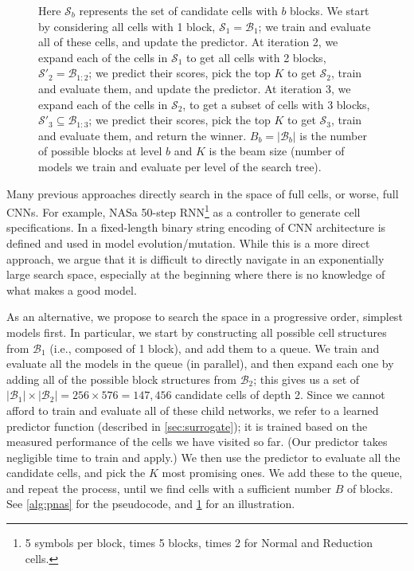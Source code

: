 \documentclass[runningheads]{llncs}
\newcommand{\NAS}{NAS}
\newcommand{\NAScell}{\NAS}
\begin{document}
\begin{figure}[t]
\begin{minipage}[c]{0.5\textwidth}
{    Here $\mathcal{S}_b$ represents the set of candidate cells with $b$ blocks.
    We start by considering all cells with 1 block, $\mathcal{S}_1 = \mathcal{B}_1$;
    we train and evaluate all of these cells, and update the predictor.
    At iteration 2, we expand each of the cells in $\mathcal{S}_1$ 
    to get all cells with 2 blocks, $\mathcal{S}'_2 = \mathcal{B}_{1:2}$;
    we predict their scores, pick the top $K$ to get $\mathcal{S}_2$,
    train and evaluate them, and update the predictor.
    At iteration 3, we expand each of the cells in $\mathcal{S}_2$,  to get a subset of cells with 3 blocks,
    $\mathcal{S}'_3 \subseteq \mathcal{B}_{1:3}$;
     we predict their scores, pick the top $K$ to get $\mathcal{S}_3$, train and evaluate them,
     and return the winner.
 $B_b = |\mathcal{B}_b|$ is the number of possible blocks at level $b$
    and $K$ is the beam size (number of models we
    train and evaluate per level of the search tree).
    }
    \label{fig:PNAStree}
    \end{minipage}
\end{figure}Many previous approaches directly search in the space of full cells,
or worse,
full CNNs.
For example, \NAScell\uses a 50-step RNN\footnote{5 symbols per block, times 5 blocks, times 2 for Normal and Reduction cells.
}%
as a controller to generate cell specifications.
In \cite{DBLP:journals/corr/XieY17} a fixed-length binary string encoding of CNN architecture is defined and used in model evolution/mutation.
While this is a more direct approach, we argue that it is difficult to directly navigate in an exponentially large search space, especially at the beginning where there is no knowledge of what makes a good model.

As an alternative, we propose to search the space in a progressive order,
simplest models first.
In particular, we start by constructing all possible cell structures 
from $\mathcal{B}_1$ (i.e., composed of 1 block),
and add them to a queue.
We train and evaluate all the models in the queue (in parallel),
and then expand each one by
adding all of the possible  block structures from $\mathcal{B}_2$;
this gives us a set of
$|\mathcal{B}_1| \times |\mathcal{B}_2| = 256 \times 576 = 147,456$ candidate cells of depth 2.
Since 
we cannot afford to 
train and evaluate  all of these child networks,
 we refer to a learned predictor function
(described in \cref{sec:surrogate});
it is trained based on the measured performance of the cells we have visited so far.
(Our predictor takes negligible time to train and apply.)
We then use the predictor to evaluate all the candidate cells,
and pick the $K$ most promising ones.
We add these to the queue, and repeat the process,
until we find cells with a sufficient number $B$ of blocks.
See \cref{alg:pnas} for the pseudocode,
and \cref{fig:PNAStree} for an illustration.
\end{document}
